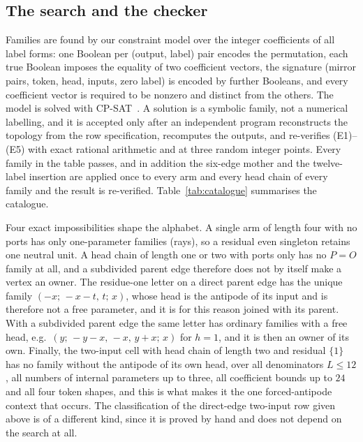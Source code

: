 \documentclass[11pt,a4paper]{article}
\theoremstyle{plain}
\theoremstyle{definition}
\theoremstyle{remark}
\newcommand{\PO}{P\!=\!O}
\begin{document}
\subsection{The search and the checker}

Families are found by our constraint model over the integer coefficients of all
label forms: one Boolean per (output, label) pair encodes the permutation,
each true Boolean imposes the equality of two coefficient vectors, the
signature (mirror pairs, token, head, inputs, zero label) is encoded by further
Booleans, and every coefficient vector is required to be nonzero and distinct
from the others.  The model is solved with CP-SAT~\cite{ORTools}.  A solution
is a symbolic family, not a numerical labelling, and it is accepted only after
an independent program reconstructs the topology from the row specification,
recomputes the outputs, and re-verifies (E1)--(E5) with exact rational
arithmetic and at three random integer points.  Every family in the table
passes, and in addition the six-edge mother and the twelve-label insertion are
applied once to every arm and every head chain of every family and the result
is re-verified.  Table~\ref{tab:catalogue} summarises the catalogue.

\begin{table}[t]
\centering
\caption{The certificate table, by kind of context: the contexts that occur
(Lemma~\ref{lem:contexts}), those for which the catalogue carries a family,
the number of families, the contexts with a family satisfying (E6), and the
contexts whose chosen family carries a token.  The residue-two rigid row is a
constructor template and not a symbolic family, so it is counted as covered in
the second column and in none of the others.}
\label{tab:catalogue}

\end{table}

Four exact impossibilities shape the alphabet.  A single arm of length four
with no ports has only one-parameter families (rays), so a residual even
singleton retains one neutral unit.  A head chain of length one or two with
ports only has no $\PO$ family at all, and a subdivided parent edge therefore
does not by itself make a vertex an owner.  The residue-one letter on a direct parent
edge has the unique family $(-x;\,-x-t,\,t;\,x)$, whose head is the antipode
of its input and is therefore not a free parameter, and it is for this reason
joined with its parent.  With a subdivided parent edge the same letter has
ordinary families with a free head, e.g.\ $(y;\,-y-x,\,-x,\,y+x;\,x)$ for
$h=1$, and it is then an owner of its own.  Finally, the two-input cell with
head chain of length two and residual $\{1\}$ has no family without the
antipode of its own head, over all denominators $L\le 12$, all numbers of
internal parameters up to three, all coefficient bounds up to $24$ and all
four token shapes, and this is what makes it the one forced-antipode context
that occurs.  The classification of the direct-edge two-input
row given above is of a different kind, since it is proved by hand and does
not depend on the search at all.
\end{document}
